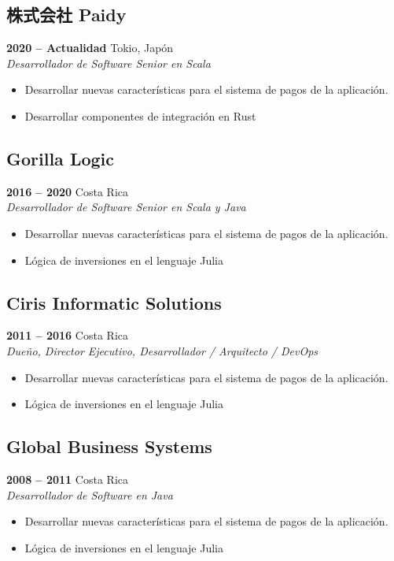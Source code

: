 \documentclass[a4paper,10pt]{article}
\begin{document}
\subsection*{株式会社 Paidy}
\textbf{2020 -- Actualidad} \hfill  Tokio, Japón \\
\emph{Desarrollador de Software Senior en Scala}
\begin{itemize}
    \item Desarrollar nuevas características para el sistema de pagos de la aplicación.
    \item Desarrollar componentes de integración en Rust
\end{itemize}

\subsection*{Gorilla Logic}
\textbf{2016 -- 2020} \hfill  Costa Rica \\
\emph{Desarrollador de Software Senior en Scala y Java}
\begin{itemize}
    \item Desarrollar nuevas características para el sistema de pagos de la aplicación.
    \item Lógica de inversiones en el lenguaje Julia
\end{itemize}

\subsection*{Ciris Informatic Solutions}
\textbf{2011 -- 2016} \hfill  Costa Rica \\
\emph{Dueño, Director Ejecutivo, Desarrollador / Arquitecto / DevOps  }
\begin{itemize}
    \item Desarrollar nuevas características para el sistema de pagos de la aplicación.
    \item Lógica de inversiones en el lenguaje Julia
\end{itemize}

\subsection*{Global Business Systems}
\textbf{2008 -- 2011} \hfill  Costa Rica \\
\emph{Desarrollador de Software en Java  }
\begin{itemize}
    \item Desarrollar nuevas características para el sistema de pagos de la aplicación.
    \item Lógica de inversiones en el lenguaje Julia
\end{itemize}
\end{document}
